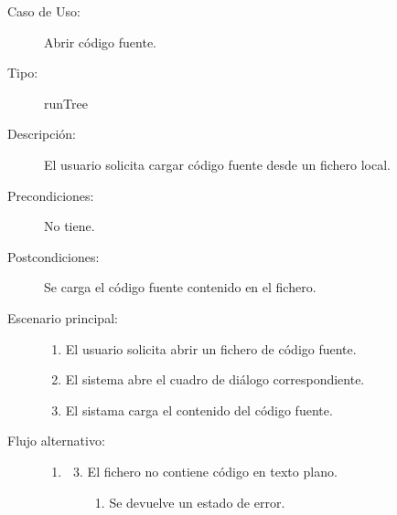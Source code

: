 \begin{description}
   \item[Caso de Uso:] Abrir código fuente.
   \item [Tipo:] runTree
   \item[Descripción:] 
   El usuario solicita cargar código fuente desde un fichero local.
   \item[Precondiciones:]
   No tiene.
   \item[Postcondiciones:] 
   Se carga el código fuente contenido en el fichero.
   \item[Escenario principal:] \hfill
   \begin{enumerate}
   \item El usuario solicita abrir un fichero de código fuente.
   \item El sistema abre el cuadro de diálogo correspondiente.
   \item El sistama carga el contenido del código fuente.
   \end{enumerate}
    \item[Flujo alternativo:] \hfill 
   \begin{enumerate} \itemsep1pt \parskip0pt 
   \setcounter{enumi}{1}
   \renewcommand{\labelenumi}{}
   \renewcommand{\labelenumiii}{\arabic{enumiii}.}
   \renewcommand{\labelenumii}{\arabic{enumi}\alph{enumii}.}
      \item 
      \begin {enumerate}
         \setcounter{enumii}{2}
         \item El fichero no contiene código en texto plano.
         \begin{enumerate}
         \item Se devuelve un estado de error.
         \end{enumerate}
      \end{enumerate}
   \end{enumerate}
\end{description}


